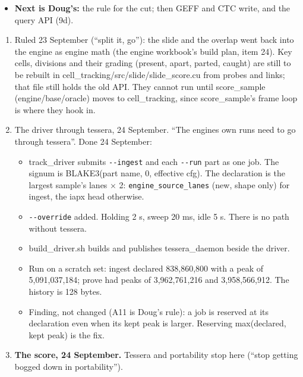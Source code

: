 \begin{itemize}
\begin{itemize}
\begin{itemize}
\item A just-divided pair separates only at levels where the parent is gone, or not at all.
\item One global drift misses daughters that move apart.
\item A division is found by a per-chain level (row 1's slide), with a per-body drift or climb in place of the frame's.
\end{itemize}
\item \textbf{Next is Doug's:} the rule for the cut; then GEFF and CTC write, and the query API (9d).
\end{itemize}
\end{itemize}

\begin{enumerate}
\item Ruled 23 September (“split it, go”): the slide and the overlap went back into the engine as engine math (the engine workbook's build plan, item 24). Key cells, divisions and their grading (present, apart, parted, caught) are still to be rebuilt in cell\_\allowbreak{}tracking/src/slide/slide\_\allowbreak{}score.cu from probes and links; that file still holds the old API. They cannot run until score\_\allowbreak{}sample (engine/base/oracle) moves to cell\_\allowbreak{}tracking, since score\_\allowbreak{}sample's frame loop is where they hook in.
\item The driver through tessera, 24 September. “The engines own runs need to go through tessera”. Done 24 September:

\begin{itemize}
\item track\_\allowbreak{}driver submits \texttt{-\allowbreak{}-\allowbreak{}ingest} and each \texttt{-\allowbreak{}-\allowbreak{}run} part as one job. The signum is BLAKE3(part name, 0, effective cfg). The declaration is the largest sample's lanes × 2: \texttt{engine\_\allowbreak{}source\_\allowbreak{}lanes} (new, shape only) for ingest, the iapx head otherwise.
\item \texttt{-\allowbreak{}-\allowbreak{}override} added. Holding 2 s, sweep 20 ms, idle 5 s. There is no path without tessera.
\item build\_\allowbreak{}driver.sh builds and publishes tessera\_\allowbreak{}daemon beside the driver.
\item Run on a scratch set: ingest declared 838,860,800 with a peak of 5,091,037,184; prove had peaks of 3,962,761,216 and 3,958,566,912. The history is 128 bytes.
\item Finding, not changed (A11 is Doug's rule): a job is reserved at its declaration even when its kept peak is larger. Reserving max(declared, kept peak) is the fix.
\end{itemize}
\item \textbf{The score, 24 September.} Tessera and portability stop here (“stop getting bogged down in portability”).


\end{enumerate}
